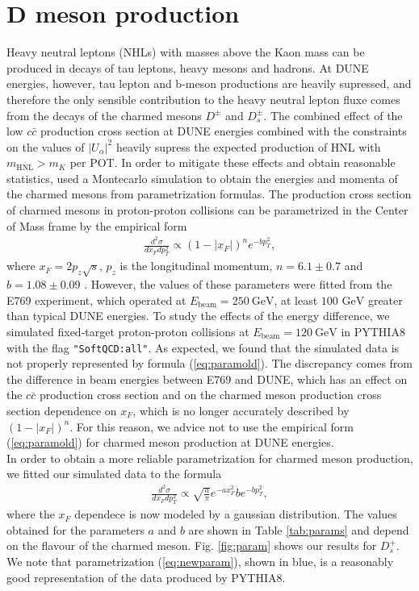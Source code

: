 \documentclass[aps,prd,twocolumn,superscriptaddress,amsmath,amssymb]{revtex4}
\def\code#1{\texttt{#1}}
\begin{document}
\section{D meson production}
Heavy neutral leptons (NHLs) with masses above the Kaon mass can be produced in decays of tau leptons, heavy mesons and hadrons. At DUNE energies, however, tau lepton and b-meson productions are heavily supressed, and therefore the only sensible contribution to the heavy neutral lepton fluxe comes from the decays of the charmed mesons $D^\pm$ and $D_s^\pm$. The combined effect of the low $c\bar{c}$ production cross section at DUNE energies combined with the constraints on the values of $|U_\alpha|^2$ heavily supress the expected production of HNL with $m_{\text{HNL}} > m_K$ per POT. In order to mitigate these effects and obtain reasonable statistics, used a Montecarlo simulation to obtain the energies and momenta of the charmed mesons from parametrization formulas. The production cross section of charmed mesons in proton-proton collisions can be parametrized in the Center of Mass frame by the empirical form
\begin{align}
\frac{d^2\sigma}{dx_F dp_T^2} \propto (1-|x_F|)^n e^{-bp_T^2},
\label{eq:paramold}
\end{align}
where $x_F=2p_z\sqrt{s}$, $p_z$ is the longitudinal momentum, $n=6.1\pm0.7$ and $b=1.08\pm0.09$ \cite{alves1996feynman}. However, the values of these parameters were fitted from the E769 experiment, which operated at $E_\text{beam} =250\ \text{GeV}$, at least $100\text{ GeV}$ greater than typical DUNE energies. To study the effects of the energy difference, we simulated fixed-target proton-proton collisions at $E_\text{beam} =120\ \text{GeV}$ in PYTHIA8 \cite{pythia} with the flag \code{"SoftQCD:all"}. As expected, we found that the simulated data is not properly represented by formula (\ref{eq:paramold}). The discrepancy comes from the difference in beam energies between E769 and DUNE, which has an effect on the $c\bar{c}$ production cross section and on the charmed meson production cross section dependence on $x_F$, which is no longer accurately described by $(1-|x_F|)^n$. For this reason, we advice not to use the empirical form (\ref{eq:paramold}) for charmed meson production at DUNE energies.\\
In order to obtain a more reliable parametrization for charmed meson production, we fitted our simulated data to the formula
\begin{align}
\frac{d^2\sigma}{dx_F dp_T^2} \propto \sqrt{\frac{a}{\pi}}e^{-ax_F^2}be^{-bp_T^2},
\label{eq:newparam}
\end{align}
where the $x_F$ dependece is now modeled by a gaussian distribution. The values obtained for the parameters $a$ and $b$ are shown in Table \ref{tab:params} and depend on the flavour of the charmed meson. Fig. \ref{fig:param} shows  our results for $D_s^+$. We note that parametrization (\ref{eq:newparam}), shown in blue, is a reasonably good representation of the data produced by PYTHIA8.
\end{document}
